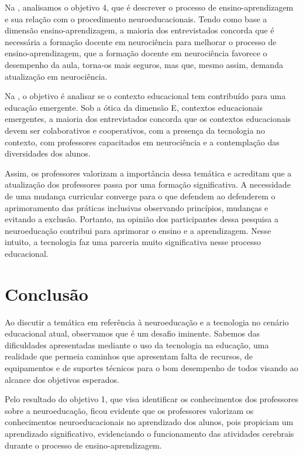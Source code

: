 \documentclass[portuguese]{textolivre}
\begin{document}
Na , analisamos o objetivo 4, que é descrever o processo de ensino-aprendizagem e sua relação com o procedimento neuroeducacionais. Tendo como base a dimensão ensino-aprendizagem, a maioria dos entrevistados concorda que é necessária a formação docente em neurociência para melhorar o processo de ensino-aprendizagem, que a formação docente em neurociência favorece o desempenho da aula, torna-os mais seguros, mas que, mesmo assim, demanda atualização em neurociência. 

Na , o objetivo é analisar se o contexto educacional tem contribuído para uma educação emergente. Sob a ótica da dimensão E, contextos educacionais emergentes, a maioria dos entrevistados concorda que os contextos educacionais devem ser colaborativos e cooperativos, com a presença da tecnologia no contexto, com professores capacitados em neurociência e a contemplação das diversidades dos alunos.

Assim, os professores valorizam a importância dessa temática e acreditam que a atualização dos professores passa por uma formação significativa. A necessidade de uma mudança curricular converge para o que defendem \textcite{molina_formacion_2020} ao defenderem o aprimoramento das práticas inclusivas observando princípios, mudanças e evitando a exclusão. Portanto, na opinião dos participantes dessa pesquisa a neuroeducação contribui para aprimorar o ensino e a aprendizagem. Nesse intuito, a tecnologia faz uma parceria muito significativa nesse processo educacional.

\section{Conclusão}\label{sec-listas}
Ao discutir a temática em referência à neuroeducação e a tecnologia no cenário educacional atual, observamos que é um desafio iminente. Sabemos das dificuldades apresentadas mediante o uso da tecnologia na educação, uma realidade que permeia caminhos que apresentam falta de recursos, de equipamentos e de suportes técnicos para o bom desempenho de todos visando ao alcance dos objetivos esperados.
	
Pelo resultado do objetivo 1, que visa identificar os conhecimentos dos professores sobre a neuroeducação, ficou evidente que os professores valorizam os conhecimentos neuroeducacionais no aprendizado dos alunos, pois propiciam um aprendizado significativo, evidenciando o funcionamento das atividades cerebrais durante o processo de ensino-aprendizagem.
\end{document}

